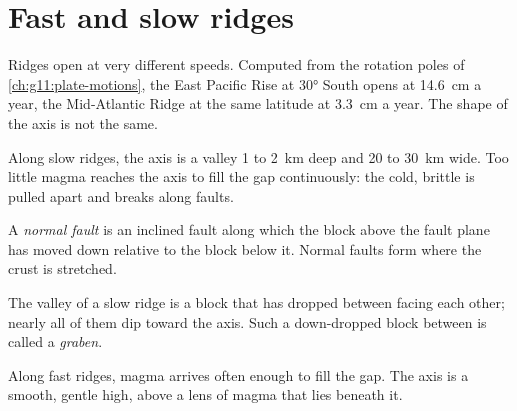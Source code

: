 \section{Fast and slow ridges}

Ridges open at very different speeds. Computed from the rotation poles of
\cref{ch:g11:plate-motions}, the East Pacific Rise at \ang{30} South opens at
\qty{14.6}{cm} a year, the Mid-Atlantic Ridge at the same latitude at
\qty{3.3}{cm} a year. The shape of the axis is not the same.

Along slow ridges, the axis is a valley 1 to \qty{2}{km} deep and 20 to
\qty{30}{km} wide. Too little magma reaches the axis to fill the gap
continuously: the cold, brittle  is pulled apart and breaks along
faults.

\begin{definition}\label{def:g11:ocean-ridges:normal-fault}
A \emph{normal fault} is an inclined fault along which
the block above the fault plane has moved down relative to the block below
it. Normal faults form where the crust is stretched.
\end{definition}

The valley of a slow ridge is a block that has dropped between 
facing each other; nearly all of them dip toward the axis. Such a down-dropped
block between  is called a \emph{graben}.

Along fast ridges, magma arrives often enough to fill the gap. The axis is a
smooth, gentle high, above a lens of magma that lies beneath it.

